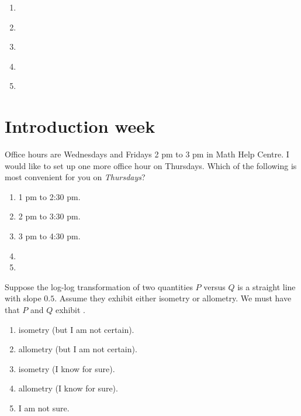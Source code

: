 \documentclass[t, 14pt]{beamer}
\begin{document}
 

\begin{frame}[c]
  \thispagestyle{empty}

  \begin{enumerate} 
    \item \underline{\hspace{4in}}
    \item \underline{\hspace{4in}}
    \item \underline{\hspace{4in}}
    \item \underline{\hspace{4in}}
    \item \underline{\hspace{4in}}
  \end{enumerate} 
\end{frame}

\section{Introduction week}

\begin{frame}[t]
  Office hours are Wednesdays and Fridays 2 pm to 3 pm in Math Help Centre.  I would like to set up one more office hour on Thursdays. Which of the following is most convenient for you on \emph{Thursdays}?

  \begin{enumerate} 
    \item 1 pm to 2:30 pm.
    \item 2 pm to 3:30 pm.
    \item 3 pm to 4:30 pm.
    \item 
    \item 
  \end{enumerate} 
\end{frame}


\begin{frame}[t]
  Suppose the log-log transformation of two quantities \(P\) versus \(Q\) is a straight line with slope \(0.5\).  Assume they exhibit either isometry or allometry. We must have that \(P\) and \(Q\) exhibit \underline{\hspace{1in}}.  

  \begin{enumerate} 
    \item isometry (but I am not certain).
    \item allometry (but I am not certain).
    \item isometry (I know for sure).
    \item allometry (I know for sure).
    \item I am not sure.
  \end{enumerate} 
\end{frame}
\end{document}
